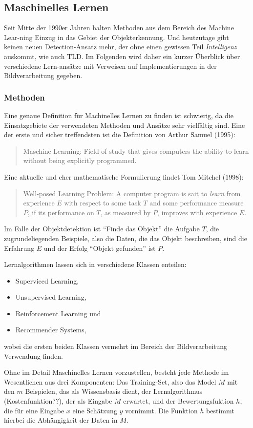 \subsection{Maschinelles Lernen}
Seit Mitte der 1990er Jahren halten Methoden aus dem Bereich des Machine Lear-ning Einzug in das Gebiet der Objekterkennung. Und heutzutage gibt keinen neuen Detection-Ansatz mehr, der ohne einen gewissen Teil \textit{Intelligenz} auskommt, wie auch TLD. Im Folgenden wird daher ein kurzer Überblick über verschiedene Lern-ansätze mit Verweisen auf Implementierungen in der Bildverarbeitung gegeben.

\subsubsection{Methoden}
Eine genaue Definition für Machinelles Lernen zu finden ist schwierig, da die Einsatzgebiete der verwendeten Methoden und Ansätze sehr vielfältig sind. Eine der erste und sicher treffendsten ist die Definition von Arthur Samuel (1995):
\begin{quote}
Maschine Learning: Field of study that gives computers the ability to learn without being explicitly programmed.
\end{quote}
Eine aktuelle und eher mathematische Formulierung findet Tom Mitchel (1998):
\begin{quote}
Well-posed Learning Problem: A computer program is sait to \textit{learn} from experience $E$ with respect to some task $T$ and some performance measure $P$, if its performance on $T$, as measured by $P$, improves with experience $E$.
\end{quote}
Im Falle der Objektdetektion ist ``Finde das Objekt'' die Aufgabe $T$, die zugrundeliegenden Beispiele, also die Daten, die das Objekt beschreiben, sind die Erfahrung $E$ und der Erfolg ``Objekt gefunden'' ist $P$.

Lernalgorithmen lassen sich in verschiedene Klassen enteilen:
\begin{itemize}
\item Superviced Learning,
\item Unsupervised Learning,
\item Reinforcement Learning und
\item Recommender Systems,
\end{itemize}
wobei die ersten beiden Klassen vermehrt im Bereich der Bildverarbeitung Verwendung finden.

Ohne im Detail Maschinelles Lernen vorzustellen, besteht jede Methode im Wesentlichen aus drei Komponenten: Das Training-Set, also das Model $M$ mit den $m$ Beispielen, das als Wissensbasis dient, der Lernalgorithmus (Kostenfunktion??), der als Eingabe $M$ erwartet, und der Bewertungsfuktion $h$, die für eine Eingabe $x$ eine Schätzung $y$ vornimmt. Die Funktion $h$ bestimmt hierbei die Abhängigkeit der Daten in $M$.

